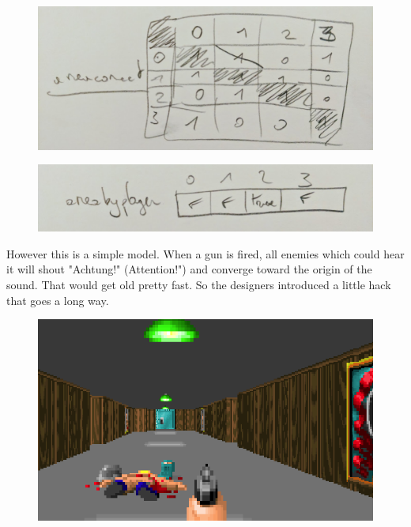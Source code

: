 \par
\begin{figure}[H]
 \centering
 \includegraphics[width=\textwidth]{imgs/soud_propagation/areaconnect.png}
\end{figure}
\par

\par
\begin{figure}[H]
 \centering
 \includegraphics[width=\textwidth]{imgs/soud_propagation/areabyplayer.png}
\end{figure}
\par









However this is a simple model. When a gun is fired, all enemies which could hear it will shout "Achtung!" (Attention!") and converge toward the origin of the sound. That would get old pretty fast. So the designers introduced a little hack that goes a long way.

\par
\begin{figure}[H]
 \centering
 \includegraphics[width=\textwidth]{imgs/ambush/map_unknown.png}
\end{figure}
\par

